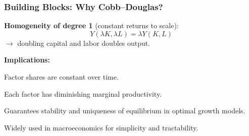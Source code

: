 \documentclass[xcolor=x11names,compress,aspectratio=169]{beamer}%
\makeatletter
\renewenvironment{itemize}{\begin{compactitemize}[<+-| alert@+>]}{\end{compactitemize}}
\makeatother
\begin{document}
\begin{frame}%
%

\frametitle{Building Blocks: Why Cobb--Douglas?}%


\begin{itemize}
\item \textbf{Homogeneity of degree 1} (constant returns to scale):
\[
Y(\lambda K,\lambda L)=\lambda Y(K,L)
\]
$\rightarrow$ doubling capital and labor doubles output. \vspace{0.3cm}

\item \textbf{Implications:}

\begin{itemize}
\item Factor shares are constant over time.

\item Each factor has diminishing marginal productivity.

\item Guarantees stability and uniqueness of equilibrium in optimal growth models.
\end{itemize}

\vspace{0.3cm}

\item Widely used in macroeconomics for simplicity and tractability.
\end{itemize}

%

\transboxout
\end{frame}%
%
\end{document}
